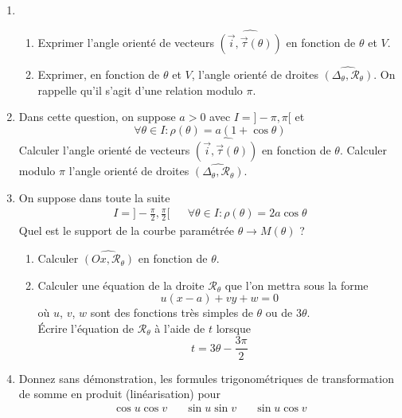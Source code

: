 \begin{enumerate}
\item \begin{enumerate}
\item Exprimer l'angle orienté de vecteurs $ \widehat{(\overrightarrow{i} , \overrightarrow{\tau}(\theta))}$ en fonction de $\theta$ et $V$.
\item Exprimer, en fonction de $\theta$ et $V$, l'angle orienté de droites $\widehat{(\Delta_\theta,\mathcal{R}_\theta)}$. On rappelle qu'il s'agit d'une relation modulo $\pi$.
\end{enumerate}
\item Dans cette question, on suppose $a>0$ avec $I = ]-\pi,\pi[$ et 
\begin{displaymath}
\forall \theta \in I : \rho(\theta)=a(1+\cos \theta) 
\end{displaymath}
Calculer l'angle orienté de vecteurs $\widehat{(\overrightarrow{i} , \overrightarrow{\tau}(\theta))}$ en fonction de $\theta$. Calculer modulo $\pi$ l'angle orienté de droites $\widehat{(\Delta_\theta , \mathcal R_\theta)}$.
\item On suppose dans toute la suite
\begin{align*}
 I = ]-\frac{\pi}{2},\frac{\pi}{2}[ & &\forall \theta \in I : \rho(\theta) = 2a\cos \theta
\end{align*}
 Quel est le support de la courbe paramétrée $\theta \rightarrow M(\theta)$ ?
\begin{enumerate}
\item Calculer $\widehat{ (Ox , \mathcal R_\theta)}$ en fonction de $\theta$.
\item Calculer une équation de la droite $\mathcal{R}_\theta$ que l'on mettra sous la forme
\[u(x-a)+vy+w=0\]
où $u$, $v$, $w$ sont des fonctions très simples de $\theta$ ou de $3\theta$.\\
{\'E}crire l'équation de $\mathcal{R}_\theta$ à l'aide de $t$ lorsque
\begin{displaymath}
 t=3\theta -\frac{3\pi}{2}
\end{displaymath}

\end{enumerate}

\item  Donnez sans démonstration, les formules trigonométriques de transformation de somme en produit (linéarisation) pour 
\begin{align*}
 \cos u \cos v & & \sin u \sin v & & \sin u \cos v
\end{align*}


\end{enumerate}
